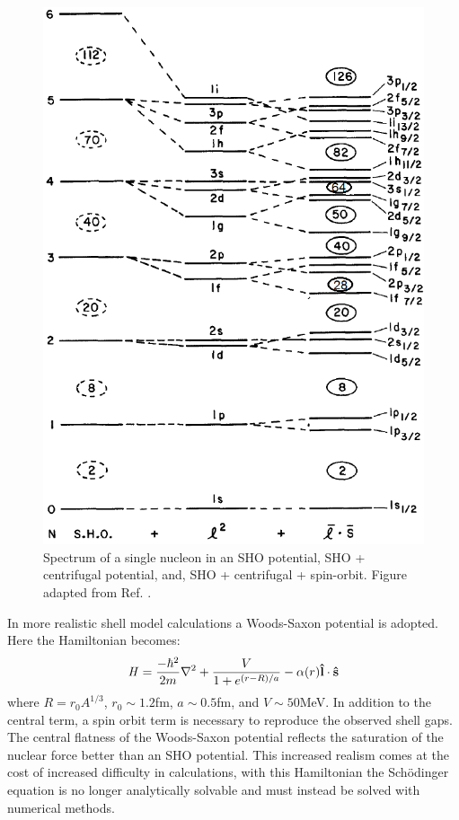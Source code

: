 \begin{figure}
\centerline{\includegraphics[height=0.45\textheight]{./img/c2/shell_model.png}}
	\caption{Spectrum of a single nucleon in an SHO potential, SHO + centrifugal potential, and, SHO + centrifugal + spin-orbit. Figure adapted from Ref. \cite{casten}.\label{fig:chp2-shell-model}}
\end{figure}


In more realistic shell model calculations a Woods-Saxon potential is adopted. Here the Hamiltonian becomes:
\begin{equation}
\label{eqn:chp2-sm-ws-hamil}
\mathbf{\mathit{H}} = \frac{-\hbar^2}{2m}\nabla^2 + \frac{V}{1+e^{(r-R)/a}} - \alpha(r)\boldsymbol{\hat{\textbf{l}}}\cdot\boldsymbol{\hat{\textbf{s}}}
\end{equation}
where $R=r_0A^{1/3}$, $r_0\sim1.2$fm, $a\sim0.5$fm, and $V\sim50$MeV. In addition to the central term, a spin orbit term is necessary to reproduce the observed shell gaps. The central flatness of the Woods-Saxon potential reflects the saturation of the nuclear force better than an SHO potential. This increased realism comes at the cost of increased difficulty in calculations, with this Hamiltonian the Sch\"odinger equation is no longer analytically solvable and must instead be solved with numerical methods.

